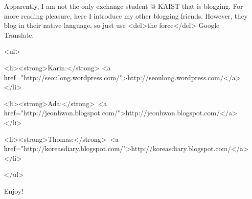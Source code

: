 \begin{post}
	\begin{content}
Apparently, I am not the only exchange student @ KAIST that is blogging. For more reading pleasure, here I introduce my other blogging friends. However, they blog in their native language, so just use <del>the force</del> Google Translate.

<ul>

	<li><strong>Karin:</strong> <a href="http://seoulong.wordpress.com/">http://seoulong.wordpress.com/</a></li>

	<li><strong>Ada:</strong> <a href="http://jeonhwon.blogspot.com/">http://jeonhwon.blogspot.com/</a></li>

	<li><strong>Thomas:</strong> <a href="http://koreasdiary.blogspot.com/">http://koreasdiary.blogspot.com/</a></li>

</ul>

Enjoy!
	\end{content}
\end{post}
